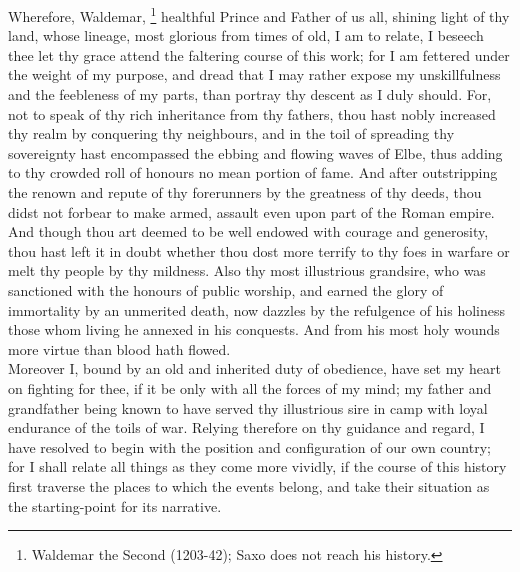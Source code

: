\documentclass[10pt,a4paper]{report}
\begin{document}
Wherefore, Waldemar, \footnote{Waldemar the Second (1203-42); Saxo does not reach his history.} healthful Prince and Father of us all, shining light of thy land, whose lineage, most glorious from times of old, I am to relate, I beseech thee let thy grace attend the faltering course of this work; for I am fettered under the weight of my purpose, and dread that I may rather expose my unskillfulness and the feebleness of my parts, than portray thy descent as I duly should. For, not to speak of thy rich inheritance from thy fathers, thou hast nobly increased thy realm by conquering thy neighbours, and in the toil of spreading thy sovereignty hast encompassed the ebbing and flowing waves of Elbe, thus adding to thy crowded roll of honours no mean portion of fame. And after outstripping the renown and repute of thy forerunners by the greatness of thy deeds, thou didst not forbear to make armed, assault even upon part of the Roman empire. And though thou art deemed to be well endowed with courage and generosity, thou hast left it in doubt whether thou dost more terrify to thy foes in warfare or melt thy people by thy mildness. Also thy most illustrious grandsire, who was sanctioned with the honours of public worship, and earned the glory of immortality by an unmerited death, now dazzles by the refulgence of his holiness those whom living he annexed in his conquests. And from his most holy wounds more virtue than blood hath flowed.\\

Moreover I, bound by an old and inherited duty of obedience, have set my heart on fighting for thee, if it be only with all the forces of my mind; my father and grandfather being known to have served thy illustrious sire in camp with loyal endurance of the toils of war. Relying therefore on thy guidance and regard, I have resolved to begin with the position and configuration of our own country; for I shall relate all things as they come more vividly, if the course of this history first traverse the places to which the events belong, and take their situation as the starting-point for its narrative.\\
\end{document}
